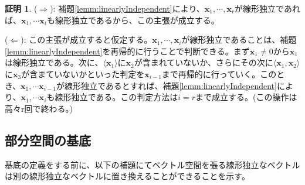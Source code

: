 \documentclass[dvipdfmx,autodetect-engine]{jsarticle}
\theoremstyle{definition}
\newtheorem*{Proof*}{証明}
\begin{document}
\begin{Proof*}
($\Rightarrow$): 補題\ref{lemm:linearlyIndependent}により、$\bm{x}_1, \cdots, \bm{x}_r$が線形独立であれば、$\bm{x}_1, \cdots \bm{x}_i$も線形独立であるから、この主張が成立する。

($\Leftarrow$): この主張が成立すると仮定する。$\bm{x}_1, \cdots, \bm{x}_i$が線形独立であることは、補題\ref{lemm:linearlyIndependent}を再帰的に行うことで判断できる。まず$\bm{x}_1 \neq 0$から$\bm{x}_1$は線形独立である。次に、$\langle \bm{x}_1 \rangle$に$\bm{x}_2$が含まれていないか、さらにその次に$\langle \bm{x}_1, \bm{x}_2 \rangle$に$\bm{x}_3$が含まていないかといった判定を$\bm{x}_{i-1}$まで再帰的に行っていく。このとき、$\bm{x}_1, \cdots \bm{x}_{i-1}$が線形独立であるとすれば、補題\ref{lemm:linearlyIndependent}により、$\bm{x}_1, \cdots \bm{x}_i$も線形独立である。この判定方法は$i = r$まで成立する。(この操作は高々r回で終わる。)
\end{Proof*}

\subsection{部分空間の基底}

基底の定義をする前に、以下の補題にてベクトル空間を張る線形独立なベクトルは別の線形独立なベクトルに置き換えることができることを示す。

\label{lemm:basisReplacing}
\end{document}
